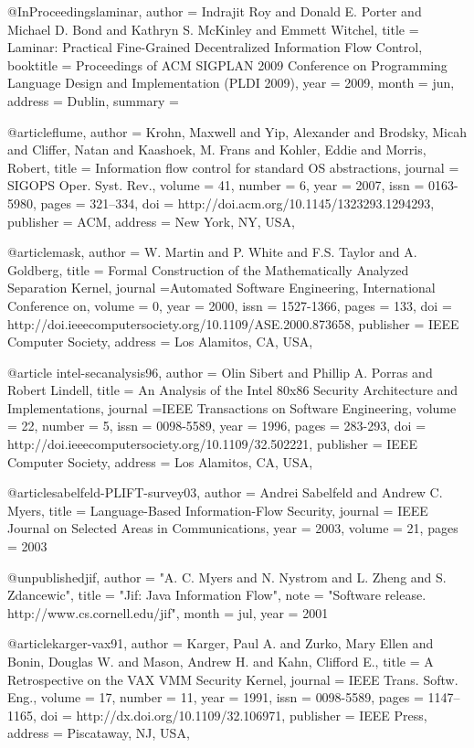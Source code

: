 @InProceedings{laminar,
    author      = {Indrajit Roy and Donald E. Porter and Michael D. Bond and Kathryn S. McKinley and Emmett Witchel},
    title       = {Laminar: Practical Fine-Grained Decentralized Information Flow Control},
    booktitle   = {Proceedings of ACM SIGPLAN 2009 Conference on Programming
                   Language Design and Implementation (PLDI 2009)},
    year        = 2009,
    month       = jun,
    address     = {Dublin},
    summary     = {}
}

@article{flume,
 author = {Krohn, Maxwell and Yip, Alexander and Brodsky, Micah and Cliffer, Natan and Kaashoek, M. Frans and Kohler, Eddie and Morris, Robert},
 title = {Information flow control for standard OS abstractions},
 journal = {SIGOPS Oper. Syst. Rev.},
 volume = {41},
 number = {6},
 year = {2007},
 issn = {0163-5980},
 pages = {321--334},
 doi = {http://doi.acm.org/10.1145/1323293.1294293},
 publisher = {ACM},
 address = {New York, NY, USA},
 }

@article{mask,
author = {W. Martin and P. White and F.S. Taylor and A. Goldberg},
title = {Formal Construction of the Mathematically Analyzed Separation Kernel},
journal ={Automated Software Engineering, International Conference on},
volume = {0},
year = {2000},
issn = {1527-1366},
pages = {133},
doi = {http://doi.ieeecomputersociety.org/10.1109/ASE.2000.873658},
publisher = {IEEE Computer Society},
address = {Los Alamitos, CA, USA},
}

@article{ intel-secanalysis96,
author = {Olin Sibert and Phillip A. Porras and Robert Lindell},
title = {An Analysis of the Intel 80x86 Security Architecture and Implementations},
journal ={IEEE Transactions on Software Engineering},
volume = {22},
number = {5},
issn = {0098-5589},
year = {1996},
pages = {283-293},
doi = {http://doi.ieeecomputersociety.org/10.1109/32.502221},
publisher = {IEEE Computer Society},
address = {Los Alamitos, CA, USA},
}

@article{sabelfeld-PLIFT-survey03,
    author = {Andrei Sabelfeld and Andrew C. Myers},
    title = {Language-Based Information-Flow Security},
    journal = {IEEE Journal on Selected Areas in Communications},
    year = {2003},
    volume = {21},
    pages = {2003}
}

@unpublished{jif,
  author =   "A. C. Myers and N. Nystrom and L. Zheng and
                  S. Zdancewic",
  title =  "{Jif}: {J}ava Information Flow",
  note =   "Software release. http://www.cs.cornell.edu/jif",
  month =  jul,
  year =   2001
}

@article{karger-vax91,
 author = {Karger, Paul A. and Zurko, Mary Ellen and Bonin, Douglas W. and Mason, Andrew H. and Kahn, Clifford E.},
 title = {A Retrospective on the VAX VMM Security Kernel},
 journal = {IEEE Trans. Softw. Eng.},
 volume = {17},
 number = {11},
 year = {1991},
 issn = {0098-5589},
 pages = {1147--1165},
 doi = {http://dx.doi.org/10.1109/32.106971},
 publisher = {IEEE Press},
 address = {Piscataway, NJ, USA},
}

